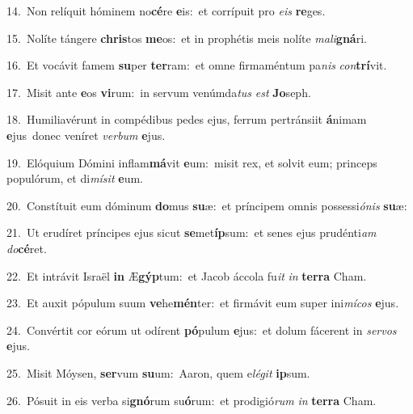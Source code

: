 {\numbfont\textcolor{\numbcolor}{14.}}~Non relíquit hóminem no\-\textbf{cé}\-re \textbf{e}\-is:~\star et corrípuit pro \textit{e}\-\textit{is} \textbf{re}\-ges.\par
{\numbfont\textcolor{\numbcolor}{15.}}~Nolíte tángere \textbf{chris}\-tos \textbf{me}\-os:~\star et in prophétis meis nolíte \textit{ma}\-\textit{li}\textbf{gná}ri.\par
{\numbfont\textcolor{\numbcolor}{16.}}~Et vocávit famem \textbf{su}\-per \textbf{ter}\-ram:~\star et omne firmaméntum pa\textit{nis} \textit{con}\-\textbf{trí}vit.\par
{\numbfont\textcolor{\numbcolor}{17.}}~Misit ante \textbf{e}\-os \textbf{vi}\-rum:~\star in servum venúmda\textit{tus} \textit{est} \textbf{Jo}\-seph.\par
{\numbfont\textcolor{\numbcolor}{18.}}~Humiliavérunt in compédibus pedes ejus, ferrum pertránsiit \textbf{á}\-nimam \textbf{e}\-jus~\star donec veníret \textit{ver}\-\textit{bum} \textbf{e}\-jus.\par
{\numbfont\textcolor{\numbcolor}{19.}}~Elóquium Dómini inflam\-\textbf{má}\-vit \textbf{e}\-um:~\star misit rex, et solvit eum; princeps populórum, et di\-\textit{mí}\-\textit{sit} \textbf{e}\-um.\par
{\numbfont\textcolor{\numbcolor}{20.}}~Constítuit eum dóminum \textbf{do}\-mus \textbf{su}\-æ:~\star et príncipem omnis possessi\-\textit{ó}\-\textit{nis} \textbf{su}\-æ:\par
{\numbfont\textcolor{\numbcolor}{21.}}~Ut erudíret príncipes ejus sicut \textbf{se}\-met\-\textbf{íp}\-sum:~\star et senes ejus prudénti\textit{am} \textit{do}\-\textbf{cé}ret.\par
{\numbfont\textcolor{\numbcolor}{22.}}~Et intrávit Israël \textbf{in} Æ\-\textbf{gýp}\-tum:~\star et Jacob áccola fu\textit{it} \textit{in} \textbf{ter}\-\textbf{ra} Cham.\par
{\numbfont\textcolor{\numbcolor}{23.}}~Et auxit pópulum suum \textbf{ve}\-he\-\textbf{mén}\-ter:~\star et firmávit eum super ini\-\textit{mí}\-\textit{cos} \textbf{e}\-jus.\par
{\numbfont\textcolor{\numbcolor}{24.}}~Convértit cor eórum ut odírent \textbf{pó}\-pulum \textbf{e}\-jus:~\star et dolum fácerent in \textit{ser}\-\textit{vos} \textbf{e}\-jus.\par
{\numbfont\textcolor{\numbcolor}{25.}}~Misit Móysen, \textbf{ser}\-vum \textbf{su}\-um:~\star Aaron, quem e\-\textit{lé}\-\textit{git} \textbf{ip}\-sum.\par
{\numbfont\textcolor{\numbcolor}{26.}}~Pósuit in eis verba si\-\textbf{gnó}\-rum su\-\textbf{ó}\-rum:~\star et prodigió\textit{rum} \textit{in} \textbf{ter}\-\textbf{ra} Cham.\par
